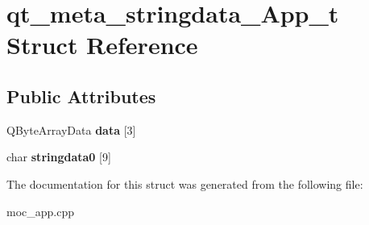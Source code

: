 \hypertarget{structqt__meta__stringdata__App__t}{}\section{qt\+\_\+meta\+\_\+stringdata\+\_\+\+App\+\_\+t Struct Reference}
\label{structqt__meta__stringdata__App__t}
\subsection*{Public Attributes}
\begin{DoxyCompactItemize}
\item 
\mbox{\label{structqt__meta__stringdata__App__t_a85817c8d361b5863dd092663958ec368}} 
Q\+Byte\+Array\+Data {\bfseries data} \mbox{[}3\mbox{]}
\item 
\mbox{\label{structqt__meta__stringdata__App__t_a87a95cee4918befb879b30dbc14b90a3}} 
char {\bfseries stringdata0} \mbox{[}9\mbox{]}
\end{DoxyCompactItemize}


The documentation for this struct was generated from the following file\+:\begin{DoxyCompactItemize}
\item 
moc\+\_\+app.\+cpp\end{DoxyCompactItemize}
